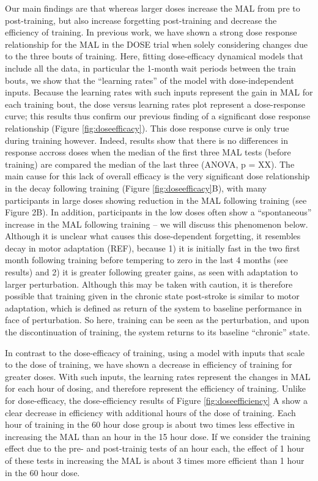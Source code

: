Our main findings are that whereas larger doses increase the MAL from pre to post-training, but also increase forgetting post-training and decrease the efficiency of training. 
In previous work, we have shown a strong dose response relationship for the MAL in the DOSE trial when solely considering changes due to the three bouts of training. 
Here, fitting dose-efficacy dynamical models that include all the data, in particular the 1-month wait periods between the train bouts, we show that the “learning rates” of the model with dose-independent inputs. 
Because the learning rates with such inputs represent the gain in MAL for each training bout, the dose versus learning rates plot represent a dose-response curve; this results thus confirm our previous finding of a significant dose response relationship (Figure \ref{fig:doseefficacy}). 
This dose response curve is only true during training however. 
Indeed, results show that there is no differences in response accross doses when the median of the first three MAL tests (before training) are compared the median of the last three (ANOVA, p = XX). 
The main cause for this lack of overall efficacy is the very significant dose relationship in the decay following training (Figure \ref{fig:doseefficacy}B), with many participants in large doses showing reduction in the MAL following training (see Figure 2B). 
In addition, participants in the low doses often show a “spontaneous” increase in the MAL following training – we will discuss this phenomenon below. 
Although it is unclear  what causes this dose-dependent forgetting, it resembles decay in motor adaptation (REF), because 1) it is initially fast in the two first month following training before tempering to zero in the last 4 months (see results) and 2) it is greater following greater gains, as seen with adaptation to larger perturbation. 
Although this may be taken with caution, it is therefore possible that training given in the chronic state post-stroke is similar to motor adaptation, which is defined as return of the system to baseline performance in face of perturbation. 
So here, training can be seen as the perturbation, and upon the discontinuation of training, the system returns to its baseline “chronic” state. 

In contrast to the dose-efficacy of training, using a model with inputs that scale to the dose of training, we have shown a decrease in efficiency of training for greater doses. 
With such inputs, the learning rates represent the changes in MAL for each hour of dosing, and therefore represent the efficiency of training. 
Unlike for dose-efficacy, the dose-efficiency results of Figure \ref{fig:doseefficiency} A show a clear decrease in efficiency with additional hours of the dose of training. 
Each hour of training in the 60 hour dose group is about two times less effective in increasing the MAL than an hour in the 15 hour dose. 
If we consider the training effect due to the pre- and post-trainig tests of an hour each, the effect of 1 hour of these tests in increasing the MAL is about 3 times more efficient than 1 hour in the 60 hour dose. 

